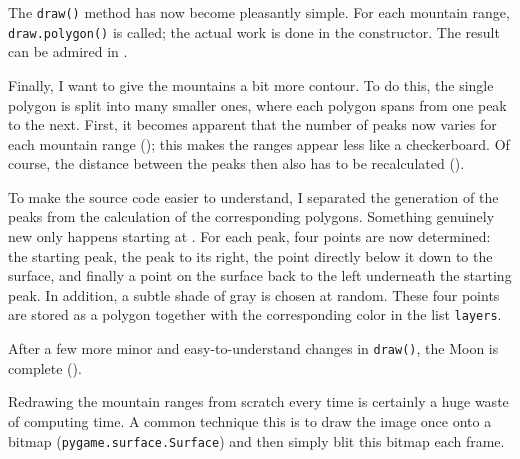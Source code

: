 The \texttt{draw()} method has now become pleasantly simple. For each mountain range, \texttt{draw.\-poly\-gon()} is called; the actual work is done in the constructor. The result can be admired in .


\begin{figure}%
	\begin{center}%
		\vspace{-1cm}%
	\end{center}%
\end{figure}%
Finally, I want to give the mountains a bit more contour. To do this, the single polygon is split into many smaller ones, where each polygon spans from one peak to the next. First, it becomes apparent that the number of peaks now varies for each mountain range (); this makes the ranges appear less like a checkerboard. Of course, the distance between the peaks then also has to be recalculated ().

To make the source code easier to understand, I separated the generation of the peaks from the calculation of the corresponding polygons. Something genuinely new only happens starting at . For each peak, four points are now determined: the starting peak, the peak to its right, the point directly below it down to the surface, and finally a point on the surface back to the left underneath the starting peak. In addition, a subtle shade of gray is chosen at random. These four points are stored as a polygon together with the corresponding color in the list \texttt{layers}.


After a few more minor and easy-to-understand changes in \texttt{draw()}, the Moon is complete ().


Redrawing the mountain ranges from scratch every time is certainly a huge waste of computing time. A common technique  this is to draw the image once onto a bitmap (\texttt{py\-game.sur\-face.Sur\-face}) and then simply blit this bitmap each frame. 

